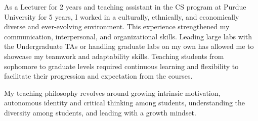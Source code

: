 \documentclass[11pt]{article}
\renewcommand*\paragraph[1]{}
\begin{document}
%
\paragraph{You should highlight your experience in teaching and mentoring students at different levels}
As a Lecturer for 2 years and teaching assistant in the CS program at Purdue University for 5 years, I worked in a culturally, ethnically, and economically diverse and ever-evolving environment. This experience strengthened my communication, interpersonal, and organizational skills. 
Leading large labs with the Undergraduate TAs or handling graduate labs on my own has allowed me to showcase my teamwork and adaptability skills. Teaching students from sophomore to graduate levels required continuous learning and flexibility to facilitate their progression and expectation from the courses.
%
\paragraph{Teaching Philosophy}
My teaching philosophy revolves around growing intrinsic motivation, autonomous identity and critical thinking among students, understanding the diversity among students, and leading with a growth mindset.
\paragraph{4) Good communication skills.}
\end{document}
